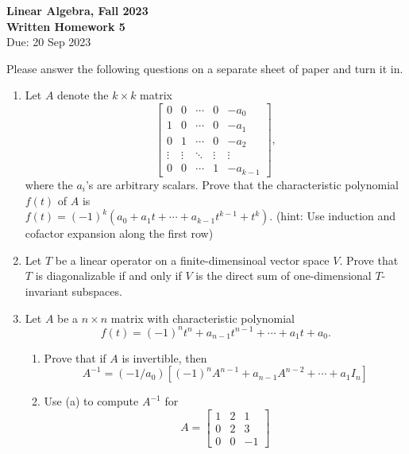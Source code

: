 \documentclass[11 pt]{article}
\begin{document}
\onehalfspacing
\begin{center}
\textbf{{\Large Linear Algebra, Fall 2023}\\
Written Homework 5}\\
Due: 20 Sep 2023
\end{center}

\noindent Please answer the following questions on a separate sheet of paper and turn it in.

\begin{enumerate}
\item Let $A$ denote the $k \times k$ matrix
\[\begin{bmatrix}
0 &0 &\cdots &0 &-a_0\\
1 &0 &\cdots &0 &-a_1\\
0 &1 &\cdots &0 &-a_2\\
\vdots &\vdots &\ddots &\vdots &\vdots\\
0 &0 &\cdots &1 &-a_{k-1}
\end{bmatrix},\]
where the $a_i$'s are arbitrary scalars. Prove that the characteristic polynomial $f(t)$ of $A$ is\\ $f(t) = (-1)^k(a_0 + a_1t + \cdots +a_{k-1}t^{k-1} + t^k)$. (hint: Use induction and cofactor expansion along the first row)

\item Let $T$ be a linear operator on a finite-dimensinoal vector space $V$. Prove that $T$ is diagonalizable if and only if $V$ is the direct sum of one-dimensional $T$-invariant subspaces.

\item Let $A$ be a $n \times n$ matrix with characteristic polynomial \[f(t) = (-1)^n t^n + a_{n-1}t^{n-1} + \cdots + a_1 t + a_0.\]
    \begin{enumerate}
    \item Prove that if $A$ is invertible, then 
    \[A^{-1} = (-1/a_0)[(-1)^n A^{n-1} + a_{n-1}A^{n-2} + \cdots + a_1 I_n]\]
    \item Use (a) to compute $A^{-1}$ for 
    \[A = \begin{bmatrix}
    1 &2 &1\\ 0 &2 &3\\ 0 &0 &-1
    \end{bmatrix}\]
    \end{enumerate}
\end{enumerate}
\end{document}
